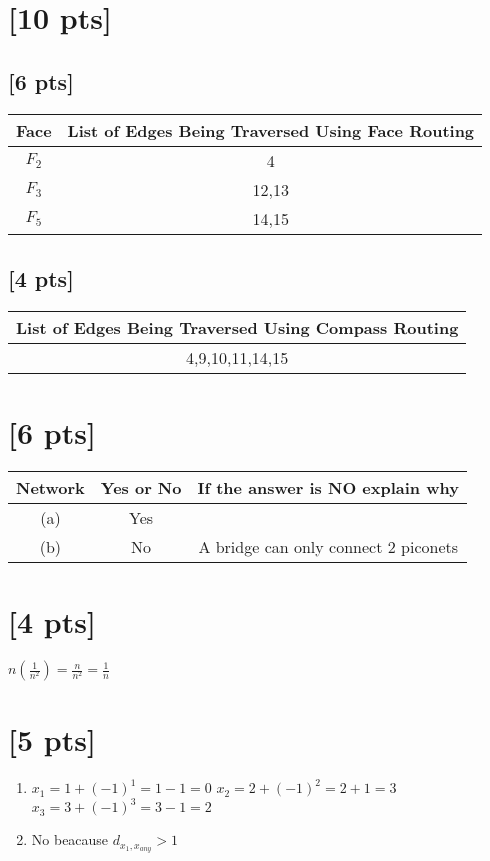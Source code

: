 \documentclass{article}
\begin{document}
    \section{[10 pts]} %
        \subsection{[6 pts]} %
            \begin{tabular}{|c||c|}
                \hline
                Face & List of Edges Being Traversed Using Face Routing \\
                \hline
                $F_2$ & 4 \\
                \hline
                $F_3$ & 12,13 \\
                \hline
                $F_5$ & 14,15 \\
                \hline
            \end{tabular}
        \subsection{[4 pts]} %
            \begin{tabular}{|c|}
                \hline
                List of Edges Being Traversed Using Compass Routing \\
                \hline
                4,9,10,11,14,15 \\
                \hline
            \end{tabular}
    \section{[6 pts]}  %
        \begin{tabular}{|c||c|c|}
            \hline
            Network & Yes or No & If the answer is NO explain why \\
            \hline
            (a) & Yes & \\
            \hline
            (b) & No & A bridge can only connect 2 piconets \\
            \hline
        \end{tabular}
    \section{[4 pts]}  %
        $n(\frac{1}{n^2}) = \frac{n}{n^2} = \frac{1}{n}$
    \section{[5 pts]}  %
        \begin{enumerate}
            \item $x_1 = 1+(-1)^1 = 1 - 1 = 0$
                \newline
                $x_2 = 2 + (-1)^2 = 2 + 1 = 3$
                \newline
                $x_3 = 3 + (-1)^3 = 3 - 1 = 2$
            \item No beacause $d_{x_1,x_{any}} > 1$
        \end{enumerate}
\end{document}
